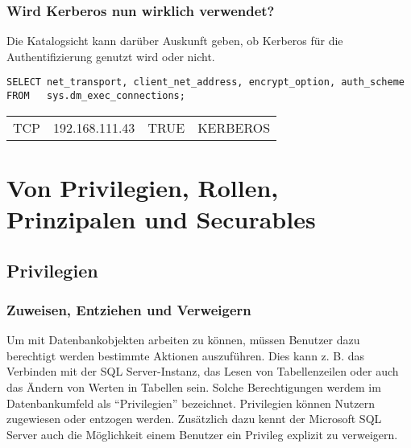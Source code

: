         \subsubsection{Wird Kerberos nun wirklich verwendet?}
          Die Katalogsicht  kann darüber
          Auskunft geben, ob Kerberos für die Authentifizierung genutzt wird
          oder nicht.
          \begin{lstlisting}[language=ms_sql,caption={Wie wird
        authentifiziert?},label=sql19_02]
SELECT net_transport, client_net_address, encrypt_option, auth_scheme
FROM   sys.dm_exec_connections;
        \end{lstlisting}
        \begin{center}
          \begin{small}
            \tablehead{}
            \begin{mssql}
              \begin{supertabular}{llll}
                TCP & 192.168.111.43 & TRUE & KERBEROS \\
              \end{supertabular}
            \end{mssql}
          \end{small}
        \end{center}
    \section{Von Privilegien, Rollen, Prinzipalen und Securables}
      \subsection{Privilegien}
        \subsubsection{Zuweisen, Entziehen und Verweigern}
          Um mit Datenbankobjekten arbeiten zu können, müssen Benutzer dazu
          berechtigt werden bestimmte Aktionen auszuführen. Dies kann z. B. das
          Verbinden mit der SQL Server-Instanz, das Lesen von Tabellenzeilen
          oder auch das Ändern von Werten in Tabellen sein. Solche
          Berechtigungen werdem im Datenbankumfeld als \enquote{Privilegien}
          bezeichnet. Privilegien können Nutzern zugewiesen oder entzogen
          werden. Zusätzlich dazu kennt der Microsoft SQL Server auch die
          Möglichkeit einem Benutzer ein Privileg explizit zu verweigern.
          
